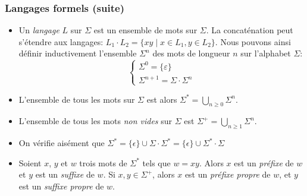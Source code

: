 %
\begin{frame}
\frametitle{Langages formels (suite)}

\begin{itemize}

  \item Un \emph{langage} $L$ sur $\Sigma$ est un ensemble
  de mots sur $\Sigma$. La concaténation peut s'étendre aux langages:
  $L_1 \cdot L_2 = \{xy \mid x \in L_1, y \in L_2\}$. Nous pouvons
  ainsi définir inductivement l'ensemble $\Sigma^{n}$ des mots de
  longueur $n$ sur l'alphabet $\Sigma$:
  \[
  \left\{
    \begin{array}{l}
      \Sigma^{0} = \{\varepsilon\}\\
      \Sigma^{n+1} = \Sigma \cdot \Sigma^{n}
    \end{array}
  \right.
  \]

  \item L'ensemble de tous les mots sur $\Sigma$ est alors
  $\Sigma^{*} = \bigcup_{n \geqslant 0}{\Sigma^{n}}$.

  \item L'ensemble de tous les mots \emph{non vides} sur
  $\Sigma$ est $\Sigma^{+} = \bigcup_{n \geqslant 1}{\Sigma^{n}}$.

  \item On vérifie aisément que $\Sigma^{*} = \{\epsilon\}
  \cup \Sigma \cdot \Sigma^{*} = \{\epsilon\} \cup \Sigma^{*} \cdot
  \Sigma$

  \item Soient $x$, $y$ et $w$ trois mots de $\Sigma^{*}$
  tels que $w = xy$. Alors $x$ est un \emph{préfixe} de $w$ et $y$ est
  un \emph{suffixe} de $w$. Si $x, y \in \Sigma^{+}$, alors $x$ est un
  \emph{préfixe propre} de $w$, et $y$ est un \emph{suffixe propre} de
  $w$.

\end{itemize}

\end{frame}

